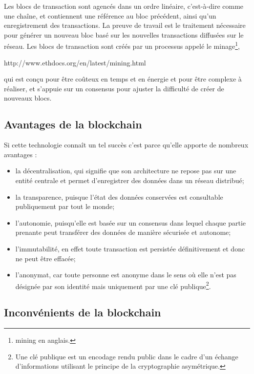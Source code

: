 \documentclass{tnreport}
\begin{document}
Les blocs de transaction sont agencés dans un ordre linéaire, c'est-à-dire comme une chaîne, et contiennent une référence au bloc précédent, ainsi qu'un enregistrement des transactions.
La preuve de travail est le traitement nécessaire pour générer un nouveau bloc basé sur les nouvelles transactions diffusées sur le réseau.
Les blocs de transaction sont créés par un processus appelé le minage\footnote{mining en anglais.},

http://www.ethdocs.org/en/latest/mining.html

 qui est conçu pour être coûteux en temps et en énergie et pour être complexe à réaliser, et s'appuie sur un consensus pour ajuster la difficulté de créer de nouveaux blocs.

\subsection{Avantages de la blockchain}

Si cette technologie connaît un tel succès c'est parce qu'elle apporte de nombreux avantages : 
\begin{itemize}
	\item la décentralisation, qui signifie que son architecture ne repose pas sur une entité centrale et permet d'enregistrer des données dans un réseau distribué; 
	\item la transparence, puisque l'état des données conservées est consultable publiquement par tout le monde; 
	\item l'autonomie, puisqu'elle est basée sur un consensus dans lequel chaque partie prenante peut transférer des données de manière sécurisée et autonome;
	\item l'immutabilité, en effet toute transaction est persistée définitivement et donc ne peut être effacée;
	\item l'anonymat, car toute personne est anonyme dans le sens où elle n'est pas désignée par son identité mais uniquement par une clé publique\footnote{Une clé publique est un encodage rendu public dans le cadre d'un échange d'informations utilisant le principe de la cryptographie asymétrique.}.
\end{itemize}

\subsection{Inconvénients de la blockchain}
\end{document}
